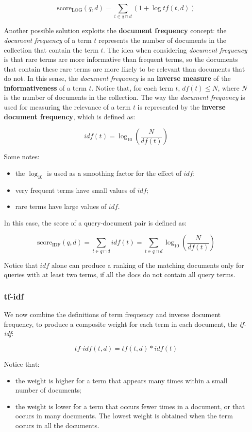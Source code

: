 $$
\text{score}_{\text{LOG}}(q,d) = \sum_{t \in q \cap d} (1 + \log tf(t,d))
$$

Another possible solution exploits the \textbf{document frequency} concept: the \textit{document frequency} of a term $t$ represents the number of documents in the collection that contain the term $t$. The idea when considering \textit{document frequency} is that rare terms are more informative than frequent terms, so the documents that contain these rare terms are more likely to be relevant than documents that do not. In this sense, the \textit{document frequency} is an \textbf{inverse measure} of the \textbf{informativeness} of a term $t$. Notice that, for each term $t$, $df(t) \leq N$, where $N$ is the number of documents in the collection. The way the \textit{document frequency} is used for measuring the relevance of a term $t$ is represented by the \textbf{inverse document frequency}, which is defined as:

$$
idf(t) = \log_{10}(\frac{N}{df(t)})
$$

Some notes:

\begin{itemize}
    \item the $\log_{10}$ is used as a smoothing factor for the effect of $idf$;
    \item very frequent terms have small values of $idf$;
    \item rare terms have large values of $idf$.
\end{itemize}

In this case, the score of a query-document pair is defined as:

$$
\text{score}_{\text{IDF}}(q,d) = \sum_{t \in q \cap d} idf(t) = \sum_{t \in q \cap d} \log_{10}(\frac{N}{df(t)})
$$

Notice that $idf$ alone can produce a ranking of the matching documents only for queries with at least two terms, if all the docs do not contain all query terms.

\subsubsection{tf-idf}
We now combine the definitions of term frequency and inverse document frequency, to produce a composite weight for each term in each document, the \textit{tf-idf}:

$$
\textit{tf-idf}(t,d) = tf(t,d) * idf(t)
$$

Notice that:

\begin{itemize}
    \item the weight is higher for a term that appears many times within a small number of documents;
    \item the weight is lower for a term that occurs fewer times in a document, or that occurs in many documents. The lowest weight is obtained when the term occurs in all the documents.
\end{itemize}

